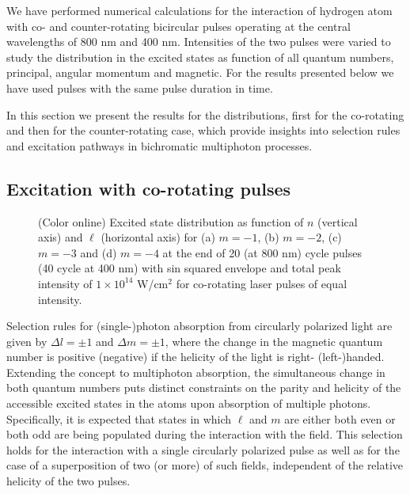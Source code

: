 
We have performed numerical calculations for the interaction of hydrogen atom with co- and counter-rotating bicircular pulses operating at the central wavelengths of 800 nm and 400 nm. Intensities of the two pulses were varied to study the distribution in the excited states as function of all quantum numbers, principal, angular momentum and magnetic. For the results presented below we have used pulses with the same pulse duration in time.  


In this section we present the results for the distributions, first for the co-rotating and then for the counter-rotating case, which provide insights into selection rules and excitation pathways in bichromatic multiphoton processes.

\subsection{Excitation with co-rotating pulses}

\begin{figure}[!ht]
\caption{\label{fig:co-nl-distribution}
(Color online)
Excited state distribution as function of $n$ (vertical axis) and $\ell$ (horizontal axis) for (a) $m = -1$, (b) $m=-2$, (c) $m=-3$ and (d) $m=-4$ at the end of 20 (at 800 nm) cycle pulses (40 cycle at 400 nm) with sin squared envelope and total peak intensity of $1\times10^{14}$ W/cm$^2$ for co-rotating laser pulses of equal intensity. 
}
\end{figure}

Selection rules for (single-)photon absorption from circularly polarized light are given by $\Delta l = \pm 1$ and $\Delta m = \pm 1$, where the change in the magnetic quantum number is positive (negative) if the helicity of the light is right- (left-)handed. Extending the concept to multiphoton absorption, the simultaneous change in both quantum numbers puts distinct constraints on the parity and helicity of the accessible excited states in the atoms upon absorption of multiple photons. Specifically, it is expected that states in which $\ell$ and $m$ are either both even or both odd are being populated during the interaction with the field. This selection holds for the interaction with a single circularly polarized pulse as well as for the case of a superposition of two (or more) of such fields, independent of the relative helicity of the two pulses. 


